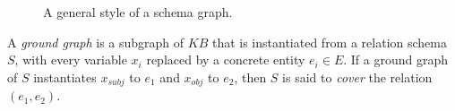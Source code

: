 \begin{figure}[th]
\centering
\caption{A general style of a schema graph.}
\label{fig:schema-example}
\end{figure}

A \textit{ground graph} is a subgraph of $KB$ that is
instantiated from a relation schema $S$, with
every variable $x_i$ replaced by a concrete entity $e_i \in E$.
If a ground graph of $S$ instantiates $x_{subj}$ to $e_1$ and $x_{obj}$ to
$e_2$, then $S$ is said to {\em cover} the relation $(e_1, e_2)$.

